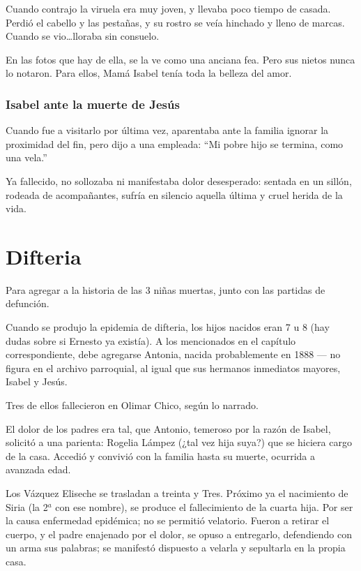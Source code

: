 \documentclass[a4paper]{article}
\begin{document}
\bigbreak{}

Cuando contrajo la viruela era muy joven, y llevaba poco tiempo de casada. Perdió el cabello y las pestañas, y su rostro se veía hinchado y lleno de marcas. Cuando se vio\ldots lloraba sin consuelo.

En las fotos que hay de ella, se la ve como una anciana fea. Pero sus nietos nunca lo notaron. Para ellos, Mamá Isabel tenía toda la belleza del amor.

\subsubsection{Isabel ante la muerte de Jesús}

Cuando fue a visitarlo por última vez, aparentaba ante la familia ignorar la proximidad del fin, pero dijo a una empleada: ``Mi pobre hijo se termina, como una vela.''

Ya fallecido, no sollozaba ni manifestaba dolor desesperado: sentada en un sillón, rodeada de acompañantes, sufría en silencio aquella última y cruel herida de la vida.

\section{Difteria}

Para agregar a la historia de las 3 niñas muertas, junto con las partidas de defunción.

Cuando se produjo la epidemia de difteria, los hijos nacidos eran 7 u 8 (hay dudas sobre si Ernesto ya existía). A los mencionados en el capítulo correspondiente, debe agregarse Antonia, nacida probablemente en 1888 --- no figura en el archivo parroquial, al igual que sus hermanos inmediatos mayores, Isabel y Jesús.

Tres de ellos fallecieron en Olimar Chico, según lo narrado.

El dolor de los padres era tal, que Antonio, temeroso por la razón de Isabel, solicitó a una parienta: Rogelia Lámpez (¿tal vez hija suya?) que se hiciera cargo de la casa. Accedió y convivió con la familia hasta su muerte, ocurrida a avanzada edad.

Los Vázquez Eliseche se trasladan a treinta y Tres. Próximo ya el nacimiento de Siria (la 2$^{a}$ con ese nombre), se produce el fallecimiento de la cuarta hija. Por ser la causa enfermedad epidémica; no se permitió velatorio. Fueron a retirar el cuerpo, y el padre enajenado por el dolor, se opuso a entregarlo, defendiendo con un arma sus palabras; se manifestó dispuesto a velarla y sepultarla en la propia casa.
\end{document}
